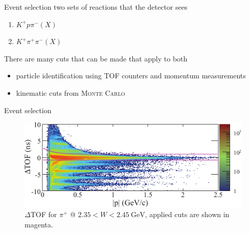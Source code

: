 \documentclass[11pt,aspectratio=1610,dvipsnames]{beamer}
\begin{document}
\begin{frame}{Event selection}
two sets of reactions that the detector sees
	
	\begin{enumerate}
		\item $K^+p\pi^-(X)$
		\item $K^+\pi^+\pi^-(X)$
	\end{enumerate}
There are many cuts that can be made that apply to both
	\begin{tcolorbox}[colback=black!10,colframe=gray!20!black,title=Initial selection of particles] 
		\begin{itemize}
			\item particle identification using TOF counters and momentum measurements
			\item kinematic cuts from \textsc{Monte Carlo}
			
		\end{itemize}
	\end{tcolorbox}
\end{frame}
\begin{frame}{Event selection}
\begin{figure}
	\centering
	\includegraphics[width=\linewidth]{tof_pi}
	\caption*{$\Delta$TOF for $\pi^+$ @ $2.35 < W < \SI{2.45}{\giga\eV}$, applied cuts are shown in magenta. \citet{lineshapes}}
\end{figure}
\end{frame}
\end{document}
